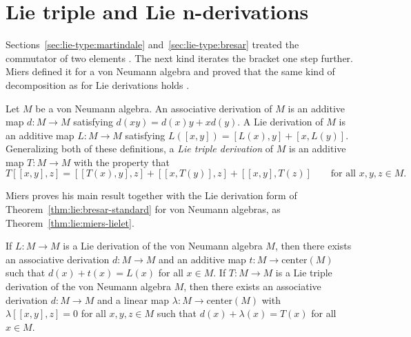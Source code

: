 \section{Lie triple and Lie n-derivations}\label{sec:lie-type:triple-and-n}

Sections~\ref{sec:lie-type:martindale} and~\ref{sec:lie-type:bresar} treated
the commutator of two elements \cite[p.~57]{Miers1978}. The next kind iterates
the bracket one step further. Miers defined it for a von Neumann algebra and
proved that the same kind of decomposition as for Lie derivations holds
\cite[p.~57]{Miers1978}.

\begin{definition}\label{def:lie:miers}
Let $M$ be a von Neumann algebra. An
associative derivation of $M$ is an additive map $d\colon M\to M$ satisfying
$d(xy)=d(x)y+xd(y)$. A Lie derivation of $M$ is an additive map $L\colon M\to M$
satisfying $L([x,y])=[L(x),y]+[x,L(y)]$. Generalizing both of these definitions,
a \emph{Lie triple derivation} of $M$ is an additive map $T\colon M\to M$ with the
property that
\[
T[[x,y],z]=[[T(x),y],z]+[[x,T(y)],z]+[[x,y],T(z)]\qquad\text{for all }x,y,z\in M.
\]
\end{definition}

Miers proves his main result together with the Lie derivation form of
Theorem~\ref{thm:lie:bresar-standard} for von Neumann algebras, as
Theorem~\ref{thm:lie:miers-lielet}.

\begin{theorem}\label{thm:lie:miers-lielet}
If $L\colon M\to M$ is a Lie derivation of the von Neumann algebra $M$, then
there exists an associative derivation $d\colon M\to M$ and an additive map
$t\colon M\to \mathrm{center}(M)$ such that $d(x)+t(x)=L(x)$ for all $x\in M$.
If $T\colon M\to M$ is a Lie triple derivation of the von Neumann algebra $M$,
then there exists an associative derivation $d\colon M\to M$ and a linear map
$\lambda\colon M\to \mathrm{center}(M)$ with $\lambda[[x,y],z]=0$ for all
$x,y,z\in M$ such that $d(x)+\lambda(x)=T(x)$ for all $x\in M$.
\end{theorem}

